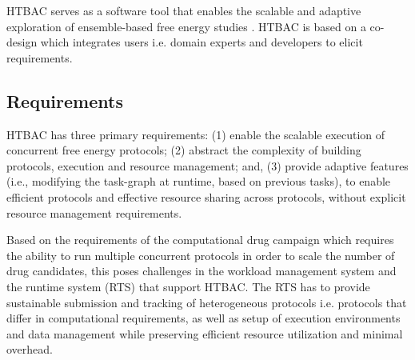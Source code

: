HTBAC serves as a software tool that enables the scalable and adaptive
exploration of ensemble-based free energy studies .
HTBAC is based on a co-design which integrates users i.e. domain experts and
developers to elicit requirements.


\subsection{Requirements}

HTBAC has three primary requirements: (1) enable the scalable execution of
concurrent free energy protocols; (2) abstract the complexity of building
protocols, execution and resource management; and, (3) provide
adaptive features (i.e., modifying the task-graph at runtime, based on
previous tasks), to enable efficient protocols and effective resource sharing
across protocols, without explicit resource management requirements.

Based on the requirements of the computational drug campaign  which requires the ability to run multiple concurrent protocols in
order to scale the number of drug candidates, this poses challenges in the
workload management system and the runtime system (RTS) that support
HTBAC. The RTS has to
provide sustainable submission and tracking of heterogeneous protocols
i.e. protocols that differ in computational
requirements, as well as setup of execution environments and data management
while preserving efficient resource utilization and minimal
overhead.

